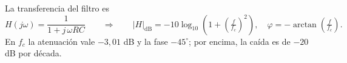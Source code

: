 La transferencia del filtro es
\[ H(j\omega) = \frac{1}{1 + j\,\omega RC} \qquad\Longrightarrow\qquad |H|_{\mathrm{dB}} = -10\log_{10}\!\left(1 + \left(\tfrac{f}{f_c}\right)^{2}\right), \quad \varphi = -\arctan\!\left(\tfrac{f}{f_c}\right). \]
En $f_c$ la atenuación vale $-3{,}01$ dB y la fase $-45^\circ$; por encima, la caída es de $-20$ dB por década.
